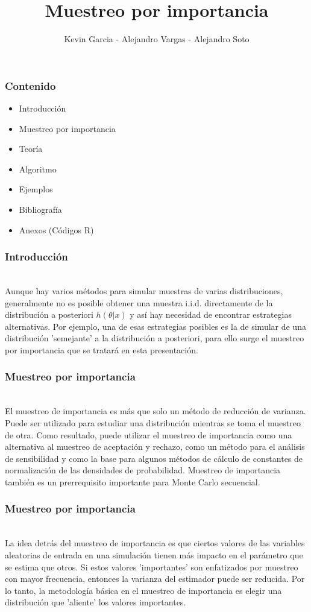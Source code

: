 \documentclass[12pt]{beamer}
\author{Kevin Garcia - Alejandro Vargas - Alejandro Soto}
\title{Muestreo por importancia}
\begin{document}
\begin{frame}
\titlepage
\end{frame}

\begin{frame}
\frametitle{Contenido}
\begin{itemize}
\item Introducción
\item Muestreo por importancia
\item Teoría
\item Algoritmo
\item Ejemplos
\item Bibliografía
\item Anexos (Códigos R)
\end{itemize}
\end{frame}

\begin{frame}
\frametitle{Introducción}
~\\Aunque hay varios métodos para simular muestras de varias distribuciones, generalmente no es posible obtener una muestra i.i.d. directamente de la distribución a posteriori $h(\theta|x)$ y así hay necesidad de encontrar estrategias alternativas. Por ejemplo, una de esas estrategias posibles es la de simular de una distribución 'semejante' a la distribución a posteriori, para ello surge el muestreo por importancia que se tratará en esta presentación.
\end{frame}

\begin{frame}
\frametitle{Muestreo por importancia}
~\\El muestreo de importancia es más que solo un método de reducción de varianza. Puede
ser utilizado para estudiar una distribución mientras se toma el muestreo de otra. Como resultado,
puede utilizar el muestreo de importancia como una alternativa al muestreo de aceptación y rechazo, como un método para el análisis de sensibilidad y como la base para algunos métodos de cálculo de constantes de normalización de las densidades de probabilidad. Muestreo de importancia
también es un prerrequisito importante para Monte Carlo secuencial.
\end{frame}

\begin{frame}
\frametitle{Muestreo por importancia}
~\\La idea detrás del muestreo de importancia es que ciertos valores de las variables aleatorias de entrada en una simulación tienen más impacto en el parámetro que se estima que otros. Si estos valores 'importantes' son enfatizados por muestreo con mayor frecuencia, entonces la varianza del estimador puede ser reducida. Por lo tanto, la metodología básica en el muestreo de importancia es elegir una distribución que 'aliente' los valores importantes.
\end{frame}
\end{document}
